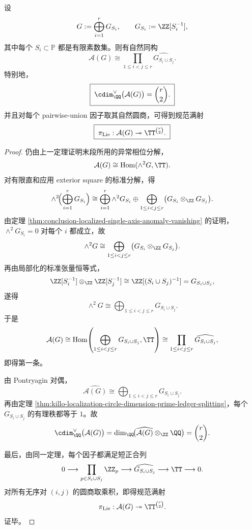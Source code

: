 \begin{theorem}\label{thm:conclusion-localized-anomaly-pairwise-union-product}
设
\[
G:=\bigoplus_{i=1}^r G_{S_i},
\qquad
G_{S_i}:=\ZZ[S_i^{-1}],
\]
其中每个 \(S_i\subset\mathbb P\) 都是有限素数集。则有自然同构
\[
\boxed{\;
\mathcal A(G)\cong \prod_{1\le i<j\le r}\widehat{G_{S_i\cup S_j}}.\;}
\]
特别地，
\[
\boxed{\;
\cdim_{\QQ}^{\vee}\bigl(\mathcal A(G)\bigr)=\binom r2.\;}
\]
并且对每个 pairwise-union 因子取其自然圆商，可得到规范满射
\[
\boxed{\;
\pi_{\mathrm{Lie}}:\mathcal A(G)\twoheadrightarrow \TT^{\binom r2}.\;}
\]
\end{theorem}
\begin{proof}
仍由上一定理证明末段所用的异常相位分解，
\[
\mathcal A(G)\cong \operatorname{Hom}(\wedge^2G,\TT).
\]
对有限直和应用 exterior square 的标准分解，得
\[
\wedge^2\!\Bigl(\bigoplus_{i=1}^r G_{S_i}\Bigr)
\cong
\bigoplus_{i=1}^r\wedge^2G_{S_i}
\oplus
\bigoplus_{1\le i<j\le r}\bigl(G_{S_i}\otimes_{\ZZ}G_{S_j}\bigr).
\]
由定理 \ref{thm:conclusion-localized-single-axis-anomaly-vanishing} 的证明，\(\wedge^2G_{S_i}=0\) 对每个 \(i\) 都成立，故
\[
\wedge^2G
\cong
\bigoplus_{1\le i<j\le r}\bigl(G_{S_i}\otimes_{\ZZ}G_{S_j}\bigr).
\]
再由局部化的标准张量恒等式，
\[
\ZZ[S_i^{-1}]\otimes_{\ZZ}\ZZ[S_j^{-1}]
\cong
\ZZ[(S_i\cup S_j)^{-1}]
=
G_{S_i\cup S_j},
\]
遂得
\[
\wedge^2G\cong \bigoplus_{1\le i<j\le r}G_{S_i\cup S_j}.
\]
于是
\[
\mathcal A(G)
\cong
\operatorname{Hom}\!\left(\bigoplus_{1\le i<j\le r}G_{S_i\cup S_j},\TT\right)
\cong
\prod_{1\le i<j\le r}\widehat{G_{S_i\cup S_j}},
\]
即得第一条。

由 Pontryagin 对偶，
\[
\widehat{\mathcal A(G)}
\cong
\bigoplus_{1\le i<j\le r}G_{S_i\cup S_j}.
\]
再由定理 \ref{thm:killo-localization-circle-dimension-prime-ledger-splitting}，每个 \(G_{S_i\cup S_j}\) 的有理秩都等于 \(1\)。故
\[
\cdim_{\QQ}^{\vee}\bigl(\mathcal A(G)\bigr)
=
\dim_{\QQ}\!\bigl(\widehat{\mathcal A(G)}\otimes_{\ZZ}\QQ\bigr)
=
\binom r2.
\]

最后，由同一定理，每个因子都满足短正合列
\[
0\longrightarrow \prod_{p\in S_i\cup S_j}\ZZ_p
\longrightarrow
\widehat{G_{S_i\cup S_j}}
\longrightarrow
\TT
\longrightarrow 0.
\]
对所有无序对 \((i,j)\) 的圆商取乘积，即得规范满射
\[
\pi_{\mathrm{Lie}}:\mathcal A(G)\twoheadrightarrow \TT^{\binom r2}.
\]
证毕。
\end{proof}

